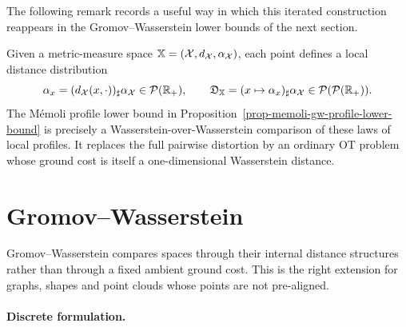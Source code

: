 The following remark records a useful way in which this iterated construction reappears in the Gromov--Wasserstein lower bounds of the next section.

\begin{rem}
	Given a metric-measure space $\mathbb{X}=(\mathcal{X},d_{\mathcal{X}},\alpha_{\mathcal{X}})$, each point defines a local distance distribution
\[
	\alpha_x=(d_{\mathcal{X}}(x,\cdot))_\sharp\alpha_{\mathcal{X}}\in\mathcal{P}(\mathbb{R}_+),
	\qquad
	\mathfrak D_{\mathbb{X}}=(x\mapsto\alpha_x)_\sharp\alpha_{\mathcal{X}}\in\mathcal{P}(\mathcal{P}(\mathbb{R}_+)).
\]
The M\'emoli profile lower bound in Proposition~\ref{prop-memoli-gw-profile-lower-bound} is precisely a Wasserstein-over-Wasserstein comparison of these laws of local profiles. It replaces the full pairwise distortion by an ordinary OT problem whose ground cost is itself a one-dimensional Wasserstein distance.
%
\end{rem}

\section{Gromov--Wasserstein}
\label{sec-gromov-wasserstein}

Gromov--Wasserstein compares spaces through their internal distance structures rather than through a fixed ambient ground cost. This is the right extension for graphs, shapes and point clouds whose points are not pre-aligned.

\paragraph{Discrete formulation.}

